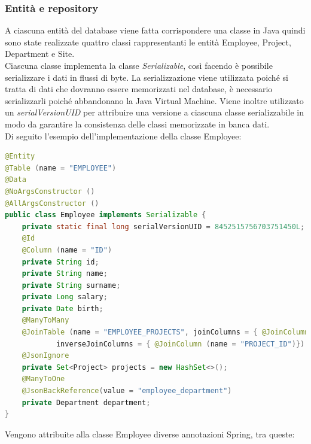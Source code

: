 \subsubsection*{Entità e repository}
A ciascuna entità del database viene fatta corrispondere una classe in Java quindi sono state realizzate quattro classi rappresentanti le entità Employee, Project, Department e Site.\\
Ciascuna classe implementa la classe \textit{Serializable}, così facendo è possibile serializzare i dati in flussi di byte. La serializzazione viene utilizzata poiché si tratta di dati che dovranno essere memorizzati nel database, è necessario serializzarli poiché abbandonano la Java Virtual Machine. Viene inoltre utilizzato un \textit{serialVersionUID} per attribuire una versione a ciascuna classe serializzabile in modo da garantire la consistenza delle classi memorizzate in banca dati.\\
Di seguito l'esempio dell'implementazione della classe Employee:
\begin{lstlisting}[language=Java, title={Employee.java}, morecomment={[s][\color{DarkOrchid}]{\@}{\ }}, morecomment={[s][\color{OliveGreen}]{"}{"}},]
@Entity
@Table (name = "EMPLOYEE")
@Data
@NoArgsConstructor ()
@AllArgsConstructor ()
public class Employee implements Serializable {
    private static final long serialVersionUID = 8452515756703751450L;
    @Id
    @Column (name = "ID")
    private String id;
    private String name;
    private String surname;
    private Long salary;
    private Date birth;
    @ManyToMany
    @JoinTable (name = "EMPLOYEE_PROJECTS", joinColumns = { @JoinColumn (name = "EMPLOYEE_ID")},
            inverseJoinColumns = { @JoinColumn (name = "PROJECT_ID")})
    @JsonIgnore
    private Set<Project> projects = new HashSet<>();
    @ManyToOne
    @JsonBackReference(value = "employee_department")
    private Department department;
}
\end{lstlisting}
Vengono attribuite alla classe Employee diverse annotazioni Spring, tra queste:
